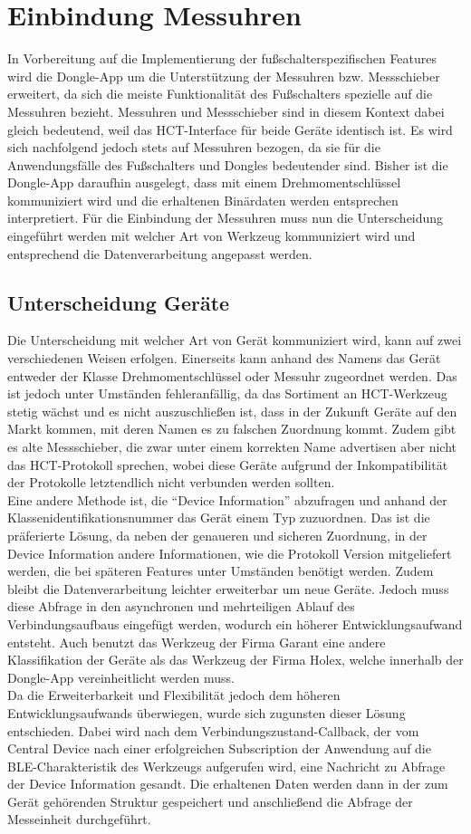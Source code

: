 \section{Einbindung Messuhren}
In Vorbereitung auf die Implementierung der fußschalterspezifischen Features wird die Dongle-App um die Unterstützung der Messuhren bzw. Messschieber erweitert, da sich die meiste Funktionalität des Fußschalters spezielle auf die Messuhren bezieht. Messuhren und Messschieber sind in diesem Kontext dabei gleich bedeutend, weil das HCT-Interface für beide Geräte identisch ist. Es wird sich nachfolgend jedoch stets auf Messuhren bezogen, da sie für die Anwendungsfälle des Fußschalters und Dongles bedeutender sind. Bisher ist die Dongle-App daraufhin ausgelegt, dass mit einem Drehmomentschlüssel kommuniziert wird und die erhaltenen Binärdaten werden entsprechen interpretiert. Für die Einbindung der Messuhren muss nun die Unterscheidung eingeführt werden mit welcher Art von Werkzeug kommuniziert wird und entsprechend die Datenverarbeitung angepasst werden.

\subsection{Unterscheidung Geräte}
Die Unterscheidung mit welcher Art von Gerät kommuniziert wird, kann auf zwei verschiedenen Weisen erfolgen. Einerseits kann anhand des Namens das Gerät entweder der Klasse Drehmomentschlüssel oder Messuhr zugeordnet werden. Das ist jedoch unter Umständen fehleranfällig, da das Sortiment an HCT-Werkzeug stetig wächst und es nicht auszuschließen ist, dass in der Zukunft Geräte auf den Markt kommen, mit deren Namen es zu falschen Zuordnung kommt. Zudem gibt es alte Messschieber, die zwar unter einem korrekten Name advertisen aber nicht das HCT-Protokoll sprechen, wobei diese Geräte aufgrund der Inkompatibilität der Protokolle letztendlich nicht verbunden werden sollten.\\
Eine andere Methode ist, die ``Device Information'' abzufragen und anhand der Klassenidentifikationsnummer das Gerät einem Typ zuzuordnen. Das ist die präferierte Lösung, da neben der genaueren und sicheren Zuordnung, in der Device Information andere Informationen, wie die Protokoll Version mitgeliefert werden, die bei späteren Features unter Umständen benötigt werden. Zudem bleibt die Datenverarbeitung leichter erweiterbar um neue Geräte. Jedoch muss diese Abfrage in den asynchronen und mehrteiligen Ablauf des Verbindungsaufbaus eingefügt werden, wodurch ein höherer Entwicklungsaufwand entsteht. Auch benutzt das Werkzeug der Firma Garant eine andere Klassifikation der Geräte als das Werkzeug der Firma Holex, welche innerhalb der Dongle-App vereinheitlicht werden muss.\\
Da die Erweiterbarkeit und Flexibilität jedoch dem höheren Entwicklungsaufwands überwiegen, wurde sich zugunsten dieser Lösung entschieden. Dabei wird nach dem Verbindungszustand-Callback, der vom Central Device nach einer erfolgreichen Subscription der Anwendung auf die BLE-Charakteristik des Werkzeugs aufgerufen wird, eine Nachricht zu Abfrage der Device Information gesandt. Die erhaltenen Daten werden dann in der zum Gerät gehörenden Struktur gespeichert und anschließend die Abfrage der Messeinheit durchgeführt.


